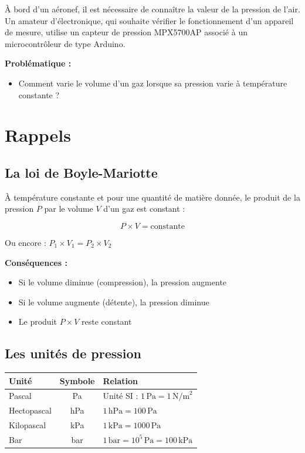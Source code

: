 \documentclass[11pt,a4paper]{article}
\begin{document}
À bord d'un aéronef, il est nécessaire de connaître la valeur de la pression de l'air. Un amateur d'électronique, qui souhaite vérifier le fonctionnement d'un appareil de mesure, utilise un capteur de pression MPX5700AP associé à un microcontrôleur de type Arduino.



\textbf{Problématique :}

\begin{itemize}
    \item Comment varie le volume d'un gaz lorsque sa pression varie à température constante ?

\end{itemize}


\section*{Rappels}

\subsection*{La loi de Boyle-Mariotte}

\begin{rappelbox}
À température constante et pour une quantité de matière donnée, le produit de la pression $P$ par le volume $V$ d'un gaz est constant :

\begin{equation}
\boxed{P \times V = \text{constante}}
\end{equation}

Ou encore : $P_1 \times V_1 = P_2 \times V_2$

\textbf{Conséquences :}
\begin{itemize}
    \item Si le volume diminue (compression), la pression augmente
    \item Si le volume augmente (détente), la pression diminue
    \item Le produit $P \times V$ reste constant
\end{itemize}
\end{rappelbox}

\subsection*{Les unités de pression}

\begin{tabular}{|l|c|l|}
\hline
\textbf{Unité} & \textbf{Symbole} & \textbf{Relation} \\
\hline
Pascal & Pa & Unité SI : $1\,\text{Pa} = 1\,\text{N/m}^2$ \\
\hline
Hectopascal & hPa & $1\,\text{hPa} = 100\,\text{Pa}$ \\
\hline
Kilopascal & kPa & $1\,\text{kPa} = 1000\,\text{Pa}$ \\
\hline
Bar & bar & $1\,\text{bar} = 10^5\,\text{Pa} = 100\,\text{kPa}$ \\
\hline
\end{tabular}
\end{document}
